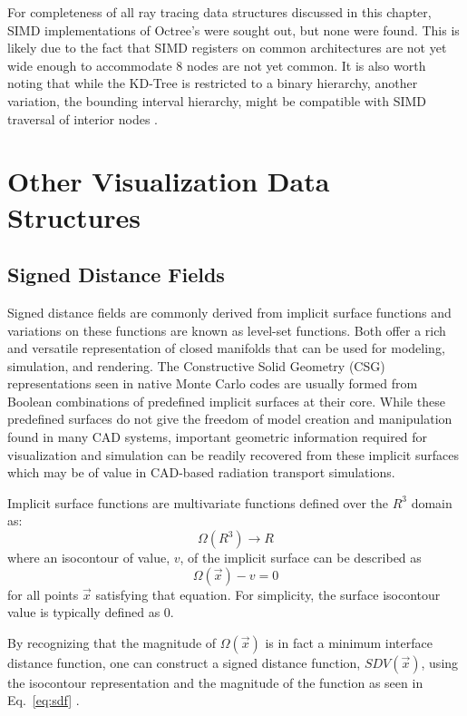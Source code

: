 For completeness of all ray tracing data structures discussed in this chapter,
SIMD implementations of Octree's were sought out, but none were found. This is
likely due to the fact that SIMD registers on common architectures are not yet
wide enough to accommodate 8 nodes are not yet common. It is also worth noting
that while the KD-Tree is restricted to a binary hierarchy, another variation,
the bounding interval hierarchy, might be compatible with SIMD traversal of
interior nodes \cite{Watcher_2006}.

\section{Other Visualization Data Structures}

\subsection{Signed Distance Fields}

Signed distance fields are commonly derived from implicit surface functions and
variations on these functions are known as level-set functions. Both offer a rich
and versatile representation of closed manifolds that can be used for modeling,
simulation, and rendering. The Constructive Solid Geometry (CSG) representations
seen in native Monte Carlo codes are usually formed from Boolean combinations of
predefined implicit surfaces at their core. While these predefined surfaces do
not give the freedom of model creation and manipulation found in many CAD
systems, important geometric information required for visualization and
simulation can be readily recovered from these implicit surfaces which may be of
value in CAD-based radiation transport simulations.

Implicit surface functions are multivariate functions defined over the
$R^3$ domain as:
\begin{equation} \label{eq:implicit_surf_rep}
      \Omega(R^3)\rightarrow R
\end{equation}
where an isocontour of value, $v$, of the implicit surface can be
described as
\begin{equation} \label{eq:implicit_surf_isocontour}
  \Omega(\vec{x}) - v  = 0 
\end{equation}
for all points $\vec{x}$ satisfying that equation. For simplicity, the surface
isocontour value is typically defined as $0$. 

By recognizing that the magnitude of $\Omega(\vec{x})$ is in fact a
minimum interface distance function, one can construct a signed
distance function, $SDV(\vec{x})$, using the isocontour representation
and the magnitude of the function as seen in Eq.~\ref{eq:sdf}
\cite{Osher_2003}.

